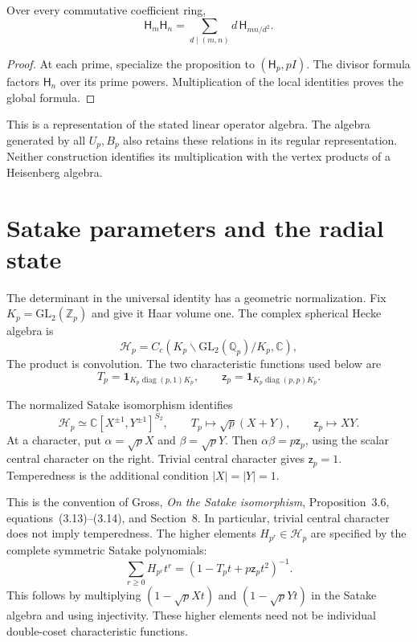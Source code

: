 \begin{corollary}
\label{v4-arith:hecke:cor:linear-law}
Over every commutative coefficient ring,
\[
 \mathsf H_m\mathsf H_n
   =\sum_{d\mid(m,n)}d\,\mathsf H_{mn/d^2}.
\]
\end{corollary}
\begin{proof}
At each prime, specialize the proposition to $(\mathsf H_p,pI)$.
The divisor formula factors $\mathsf H_n$ over its prime powers.
Multiplication of the local identities proves the global formula.
\end{proof}

This is a representation of the stated linear operator algebra.
The algebra generated by all $U_p,B_p$ also retains these relations
in its regular representation.
Neither construction identifies its multiplication with the vertex
products of a Heisenberg algebra.

\section{Satake parameters and the radial state}
\label{v4-arith:hecke:sec:satake}

The determinant in the universal identity has a geometric normalization.
Fix $K_p=\mathrm{GL}_2(\mathbb Z_p)$ and give it Haar volume one.
The complex spherical Hecke algebra is
\[
 \mathcal H_p=C_c(K_p\backslash\mathrm{GL}_2(\mathbb Q_p)/K_p,\mathbb C),
\]
The product is convolution. The two characteristic functions used below are
\[
 T_p=\mathbf1_{K_p\operatorname{diag}(p,1)K_p},\qquad
 \mathsf z_p=\mathbf1_{K_p\operatorname{diag}(p,p)K_p}.
\]

\begin{theorem}
\label{v4-arith:hecke:thm:satake}
The normalized Satake isomorphism identifies
\[
 \mathcal H_p\simeq
 \mathbb C[X^{\pm1},Y^{\pm1}]^{S_2},\qquad
 T_p\longmapsto\sqrt p(X+Y),\qquad \mathsf z_p\longmapsto XY.
\]
At a character, put $\alpha=\sqrt pX$ and $\beta=\sqrt pY$.
Then $\alpha\beta=p\mathsf z_p$, using the scalar central character on the right.
Trivial central character gives $\mathsf z_p=1$.
Temperedness is the additional condition $|X|=|Y|=1$.
\end{theorem}

This is the convention of Gross, \emph{On the Satake isomorphism},
Proposition~3.6, equations~(3.13)--(3.14), and Section~8.
In particular, trivial central character does not imply temperedness.
The higher elements $H_{p^r}\in\mathcal H_p$ are specified by
the complete symmetric Satake polynomials:
\[
 \sum_{r\geq0}H_{p^r}t^r=(1-T_pt+p\mathsf z_pt^2)^{-1}.
\]
This follows by multiplying $(1-\sqrt pXt)$ and $(1-\sqrt pYt)$
in the Satake algebra and using injectivity.
These higher elements need not be individual double-coset characteristic functions.

